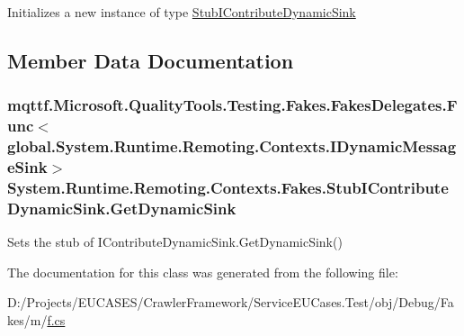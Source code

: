 Initializes a new instance of type \hyperlink{class_system_1_1_runtime_1_1_remoting_1_1_contexts_1_1_fakes_1_1_stub_i_contribute_dynamic_sink}{Stub\-I\-Contribute\-Dynamic\-Sink}



\subsection{Member Data Documentation}
\hypertarget{class_system_1_1_runtime_1_1_remoting_1_1_contexts_1_1_fakes_1_1_stub_i_contribute_dynamic_sink_a51ea239e263724f3e6ce91948941ec97}{
\subsubsection[{Get\-Dynamic\-Sink}]{\setlength{\rightskip}{0pt plus 5cm}mqttf.\-Microsoft.\-Quality\-Tools.\-Testing.\-Fakes.\-Fakes\-Delegates.\-Func$<$global.\-System.\-Runtime.\-Remoting.\-Contexts.\-I\-Dynamic\-Message\-Sink$>$ System.\-Runtime.\-Remoting.\-Contexts.\-Fakes.\-Stub\-I\-Contribute\-Dynamic\-Sink.\-Get\-Dynamic\-Sink}}\label{class_system_1_1_runtime_1_1_remoting_1_1_contexts_1_1_fakes_1_1_stub_i_contribute_dynamic_sink_a51ea239e263724f3e6ce91948941ec97}


Sets the stub of I\-Contribute\-Dynamic\-Sink.\-Get\-Dynamic\-Sink()



The documentation for this class was generated from the following file\-:\begin{DoxyCompactItemize}
\item 
D\-:/\-Projects/\-E\-U\-C\-A\-S\-E\-S/\-Crawler\-Framework/\-Service\-E\-U\-Cases.\-Test/obj/\-Debug/\-Fakes/m/\hyperlink{m_2f_8cs}{f.\-cs}\end{DoxyCompactItemize}
